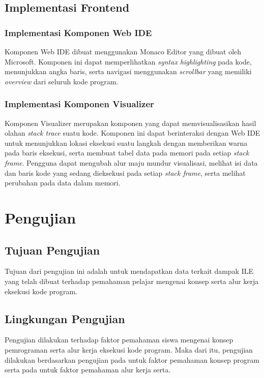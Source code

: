 \subsection{Implementasi Frontend}

\subsubsection{Implementasi Komponen Web IDE}
Komponen Web IDE dibuat menggunakan Monaco Editor yang dibuat oleh Microsoft. Komponen ini dapat memperlihatkan \textit{syntax highlighting} pada kode, menunjukkan angka baris, serta navigasi menggunakan \textit{scrollbar} yang memiliki \textit{overview} dari seluruh kode program.

\subsubsection{Implementasi Komponen Visualizer}
Komponen Visualizer merupakan komponen yang dapat memvisualisasikan hasil olahan \textit{stack trace} suatu kode. Komponen ini dapat berinteraksi dengan Web IDE untuk menunjukkan lokasi eksekusi suatu langkah dengan memberikan warna pada baris eksekusi, serta membuat tabel data pada memori pada setiap \textit{stack frame}. Pengguna dapat mengubah alur maju mundur visualisasi, melihat isi data dan baris kode yang sedang dieksekusi pada setiap \textit{stack frame}, serta melihat perubahan pada data dalam memori.


\section{Pengujian}

\subsection{Tujuan Pengujian}
Tujuan dari pengujian ini adalah untuk mendapatkan data terkait dampak ILE yang telah dibuat terhadap pemahaman pelajar mengenai konsep serta alur kerja eksekusi kode program.

\subsection{Lingkungan Pengujian}
Pengujian  dilakukan terhadap faktor pemahaman siswa mengenai konsep pemrograman serta alur kerja eksekusi kode program. Maka dari itu, pengujian dilakukan berdasarkan pengujian pada \textcite{mayer1981psychology} untuk faktor pemahaman konsep program serta pada \textcite{moons2013pilot} untuk faktor pemahaman alur kerja serta.

